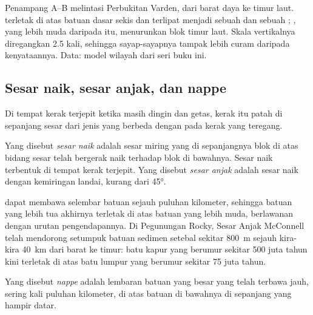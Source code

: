 \begin{omfigure}
{\small Penampang A--B melintasi Perbukitan Varden, dari barat daya ke timur
laut.  terletak di atas batuan dasar sekis dan terlipat menjadi
sebuah  dan sebuah ; , yang lebih muda daripada
 itu, menurunkan blok timur laut. Skala vertikalnya diregangkan
2.5 kali, sehingga sayap-sayapnya tampak lebih curam daripada kenyataannya.
Data: model wilayah dari seri buku ini.}
\end{omfigure}

\subsection{Sesar naik, sesar anjak, dan nappe}

Di tempat kerak terjepit ketika masih dingin dan getas, kerak itu patah di
sepanjang sesar dari jenis yang berbeda dengan  pada kerak yang
teregang.

\begin{definition}\label{def:g12:mountain-building:thrust}
Yang disebut \emph{sesar naik} adalah sesar miring yang di
sepanjangnya blok di atas bidang sesar telah bergerak naik terhadap blok di
bawahnya. Sesar naik terbentuk di tempat kerak terjepit. Yang disebut
\emph{sesar anjak} adalah sesar naik dengan kemiringan
landai, kurang dari \ang{45}.
\end{definition}

 dapat membawa selembar batuan sejauh puluhan kilometer, sehingga
batuan yang lebih tua akhirnya terletak di atas batuan yang lebih muda,
berlawanan dengan urutan pengendapannya. Di Pegunungan Rocky, Sesar Anjak
McConnell telah mendorong setumpuk batuan sedimen setebal sekitar
\qty{800}{m} sejauh kira-kira \qty{40}{km} dari barat ke timur: batu kapur yang
berumur sekitar 500 juta tahun kini terletak di atas batu lumpur yang berumur
sekitar 75 juta tahun.

\begin{definition}[Nappe]\label{def:g12:mountain-building:nappe}
Yang disebut \emph{nappe} adalah lembaran batuan yang besar yang
telah terbawa jauh, sering kali puluhan kilometer, di atas batuan di bawahnya
di sepanjang  yang hampir datar.
\end{definition}

